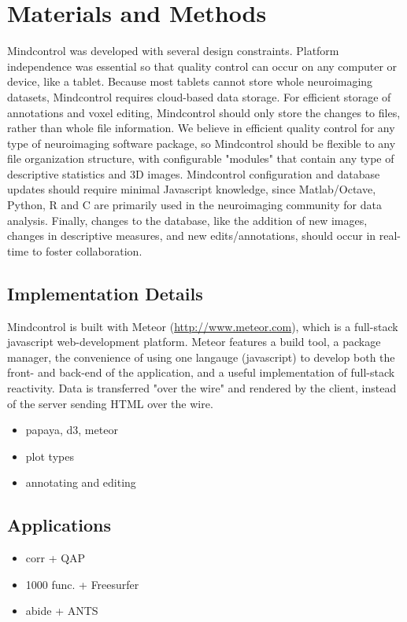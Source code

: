 \section{Materials and Methods}

Mindcontrol was developed with several design constraints. Platform independence was essential so that quality control can occur on any computer or device, like a tablet. Because most tablets cannot store whole neuroimaging datasets, Mindcontrol requires cloud-based data storage. For efficient storage of annotations and voxel editing, Mindcontrol should only store the changes to files, rather than whole file information. We believe in efficient quality control for any type of neuroimaging software package, so Mindcontrol should be flexible to any file organization structure, with configurable "modules" that contain any type of descriptive statistics and 3D images. Mindcontrol configuration and database updates should require minimal Javascript knowledge, since Matlab/Octave, Python, R and C are primarily used in the neuroimaging community for data analysis. Finally, changes to the database, like the addition of new images, changes in descriptive measures, and new edits/annotations, should occur in real-time to foster collaboration.  


\subsection{Implementation Details}

Mindcontrol is built with Meteor (\href{http://www.meteor.com}{http://www.meteor.com}), which is a full-stack javascript web-development platform. Meteor features a build tool, a package manager, the convenience of using one langauge (javascript) to develop both the front- and back-end of the application, and a useful implementation of full-stack reactivity. Data is transferred "over the wire" and rendered by the client, instead of the server sending HTML over the wire. 

\begin{itemize}
\item papaya, d3, meteor
\item plot types
\item annotating and editing
\end{itemize}

\subsection{Applications}

\begin{itemize}
\item corr + QAP
\item 1000 func. + Freesurfer
\item abide + ANTS
\end{itemize}

